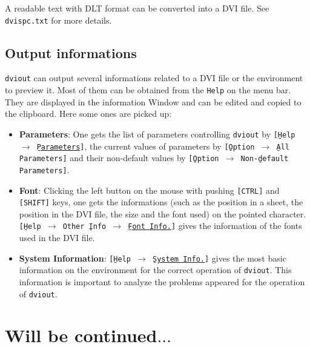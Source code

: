 \documentclass{article}
\begin{document}
A readable text with DLT format can be converted into a DVI file.
See {\tt dvispc.txt} for more details.

\subsection{Output informations}
{\tt dviout} can output several informations related to a DVI file or the
environment to preview it.  
Most of them can be obtained from the {\tt Help} on the menu bar.  
They are displayed in the information Window and can be edited and copied to 
the clipboard. 
Here some ones are picked up:

\begin{itemize}
\item
{\bf Parameters}: One gets the list of parameters controlling {\tt dviout} by
{\tt[\b{H}elp $\to$ \href{dviout:HP}{\b{P}arameters}]}, 
the current values of parameters by 
{\tt[\b{O}ption $\to$ \b{A}ll Parameters]} and their non-default values
by {\tt[\b{O}ption $\to$ Non-\b{d}efault Parameters]}.

\item
{\bf Font}: Clicking the left button on the mouse with pushing {\tt[CTRL]} and 
{\tt[SHIFT]} keys, one gets the informations (such as the position in 
a sheet, the position in the DVI file, the size and the font used) on the 
pointed character.  
{\tt[\b{H}elp $\to$ Other \b{I}nfo $\to$ \href{dviout:HF}{\b{F}ont Info.}]}
gives the information of the fonts used in the DVI file.

\item
{\bf System Information}:
{\tt[\b{H}elp $\to$ \href{dviout:HS}{\b{S}ystem Info.}]}
gives the most basic information on the environment for 
the correct operation of {\tt dviout}.  
This information is important to analyze the problems appeared 
for the operation of {\tt dviout}.
\end{itemize}
%
\section{Will be continued$\ldots$}
\end{document}

